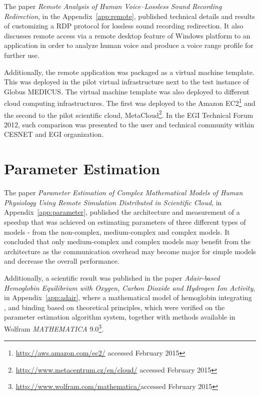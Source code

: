 The paper \cite{kulhanek2010b} \emph{Remote Analysis of Human Voice--Lossless Sound Recording Redirection}, in the Appendix~\ref{app:remote}, published technical details and results of customizing a RDP protocol for lossless sound recording redirection. It also discusses remote access via a remote desktop feature of Windows platform to an application in order to analyze human voice and produce a voice range profile for further use. 

Additionally, the 
remote application
was packaged as a virtual machine template. This was deployed in the pilot virtual infrastructure next to the test instance of Globus MEDICUS. The virtual machine template was also deployed to different cloud computing infrastructures. The first was deployed to the Amazon EC2\footnote{\url{http://aws.amazon.com/ec2/} accessed February 2015} and the second to the pilot scientific cloud, MetaCloud\footnote{\url{http://www.metacentrum.cz/en/cloud/} accessed February 2015}. In the EGI Technical Forum 2012, such comparison was presented to the user and technical community within CESNET and EGI organization\cite{Kulhanek2012a}.

\section{Parameter Estimation}
\label{sec:resultsestimation}

The paper \cite{Kulhanek2014Parameters} \emph{Parameter Estimation of Complex Mathematical Models of Human Physiology Using Remote Simulation Distributed in Scientific Cloud}, in Appendix~\ref{app:parameter}, published the architecture and measurement of a speedup that was achieved on estimating parameters of three different types of models - from the non-complex, medium-complex and complex models. It concluded that only medium-complex and complex models may benefit from the architecture as the communication overhead may become major for simple models and decrease the overall performance. 

Additionally, a scientific result was published in the paper \cite{Matejak2014sj} \emph{Adair-based Hemoglobin Equilibrium with Oxygen, Carbon Dioxide and Hydrogen Ion Activity}, in Appendix~\ref{app:adair}, where a mathematical model of hemoglobin integrating ,  and  binding based on theoretical principles, which were verified on the parameter estimation algorithm system\cite{Kulhanek2014Parameters}, together with methods available in Wolfram \emph{MATHEMATICA} 9.0\footnote{\url{http://www.wolfram.com/mathematica/}accessed February 2015}.

